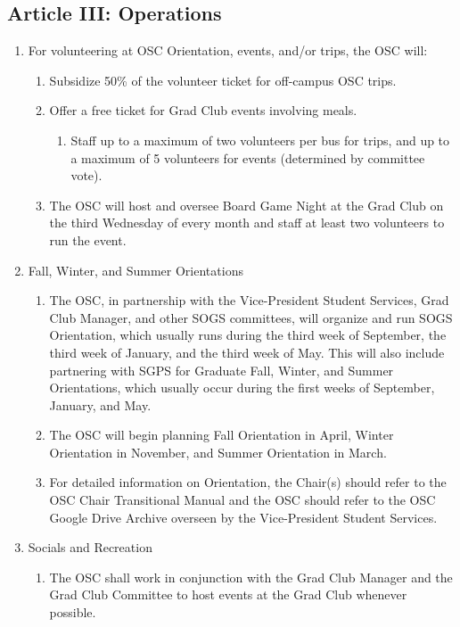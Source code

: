 \subsection{Article III: Operations}
	\begin{enumerate}[label*=\arabic*., align=left]	
	\item For volunteering at OSC Orientation, events, and/or trips, the OSC will:
	\begin{enumerate}[label*=\arabic*., align=left]
	\item Subsidize 50\% of the volunteer ticket for off-campus OSC trips.
	\item Offer a free ticket for Grad Club events involving meals.
	\begin{enumerate}[label*=\arabic*., align=left]
	\item Staff up to a maximum of two volunteers per bus for trips, and up to a maximum of 5 volunteers for events (determined by committee vote).
	\end{enumerate}
	\item The OSC will host and oversee Board Game Night at the Grad Club on the third Wednesday of every month and staff at least two volunteers to run the event.
	\end{enumerate}
	\item Fall, Winter, and Summer Orientations
	\begin{enumerate}[label*=\arabic*., align=left]
	\item The OSC, in partnership with the Vice-President Student Services, Grad Club Manager, and other SOGS committees, will organize and run SOGS Orientation, which usually runs during the third week of September, the third week of January, and the third week of May. This will also include partnering with SGPS for Graduate Fall, Winter, and Summer Orientations, which usually occur during the first weeks of September, January, and May.
	\item The OSC will begin planning Fall Orientation in April, Winter Orientation in November, and Summer Orientation in March.
	\item For detailed information on Orientation, the Chair(s) should refer to the OSC Chair Transitional Manual and the OSC should refer to the OSC Google Drive Archive overseen by the Vice-President Student Services.
	\end{enumerate}
	\item Socials and Recreation
	\begin{enumerate}[label*=\arabic*., align=left]
	\item The OSC shall work in conjunction with the Grad Club Manager and the Grad Club Committee to host events at the Grad Club whenever possible.

\end{enumerate}
\end{enumerate}
